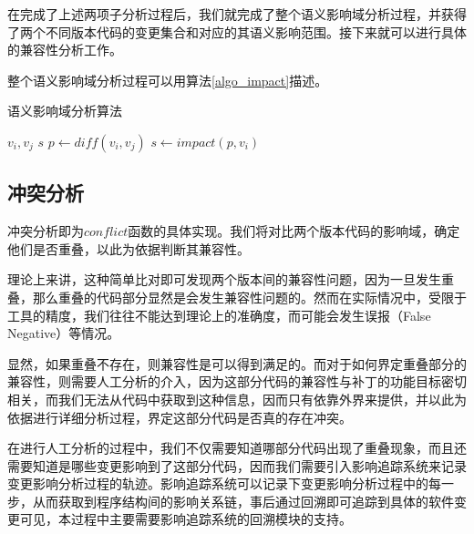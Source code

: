 %
%

在完成了上述两项子分析过程后，我们就完成了整个语义影响域分析过程，并获得了两个不同版本代码的变更集合和对应的其语义影响范围。接下来就可以进行具体的兼容性分析工作。

整个语义影响域分析过程可以用算法\ref {algo_impact}描述。

\begin{algorithm}[H]
	\caption{语义影响域分析算法}
	\label{algo_impact}
	\begin{algorithmic}[1]
		\Require $v_i,v_j$	
		\Ensure $s$
			\State $p \gets diff(v_i,v_j)$
			\State $s \gets impact(p,v_i)$
			\State{}
		\EndFunction
	\end{algorithmic}
\end{algorithm}

\subsection{冲突分析}

冲突分析即为$conflict$函数的具体实现。我们将对比两个版本代码的影响域，确定他们是否重叠，以此为依据判断其兼容性。

理论上来讲，这种简单比对即可发现两个版本间的兼容性问题，因为一旦发生重叠，那么重叠的代码部分显然是会发生兼容性问题的。然而在实际情况中，受限于工具的精度，我们往往不能达到理论上的准确度，而可能会发生误报（False Negative）等情况。

显然，如果重叠不存在，则兼容性是可以得到满足的。而对于如何界定重叠部分的兼容性，则需要人工分析的介入，因为这部分代码的兼容性与补丁的功能目标密切相关，而我们无法从代码中获取到这种信息，因而只有依靠外界来提供，并以此为依据进行详细分析过程，界定这部分代码是否真的存在冲突。

在进行人工分析的过程中，我们不仅需要知道哪部分代码出现了重叠现象，而且还需要知道是哪些变更影响到了这部分代码，因而我们需要引入影响追踪系统来记录变更影响分析过程的轨迹。影响追踪系统可以记录下变更影响分析过程中的每一步，从而获取到程序结构间的影响关系链，事后通过回溯即可追踪到具体的软件变更可见，本过程中主要需要影响追踪系统的回溯模块的支持。

